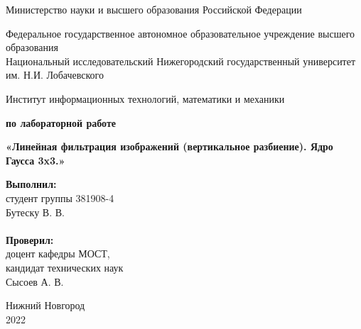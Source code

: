 \documentclass{report}
\begin{document}
\begin{titlepage}

\begin{center}
Министерство науки и высшего образования Российской Федерации
\end{center}

\begin{center}
Федеральное государственное автономное образовательное учреждение высшего образования \\
Национальный исследовательский Нижегородский государственный университет им. Н.И. Лобачевского
\end{center}

\begin{center}
Институт информационных технологий, математики и механики
\end{center}

\vspace{4em}

\begin{center}
\textbf{ по лабораторной работе} \\
\end{center}
\begin{center}
\textbf{\Large«Линейная фильтрация изображений (вертикальное разбиение). Ядро Гаусса 3x3.»} \\
\end{center}

\vspace{4em}

\newbox{\lbox}
\newlength{\maxl}
\setlength{\maxl}{\wd\lbox}
\hfill\parbox{7cm}{
\hspace*{5cm}\hspace*{-5cm}\textbf{Выполнил:} \\ студент группы 381908-4 \\ Бутеску В. В.\\
\\
\hspace*{5cm}\hspace*{-5cm}\textbf{Проверил:}\\ доцент кафедры МОСТ, \\ кандидат технических наук \\ Сысоев А. В.\\
}
\vspace{\fill}

\begin{center} Нижний Новгород \\ 2022 \end{center}

\end{titlepage}
\end{document}
